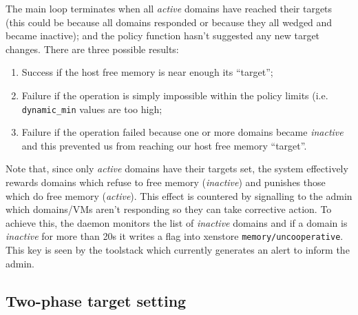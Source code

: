 \documentclass{article}
\begin{document}
The main loop terminates when all {\em active} domains have reached their targets (this could be because all domains responded or because they all wedged and became inactive); and the policy function hasn't suggested any new target changes. There are three possible results:
\begin{enumerate}
\item Success if the host free memory is near enough its ``target'';
\item Failure if the operation is simply impossible within the policy limits (i.e. \texttt{dynamic\_min} values are too high;
\item Failure if the operation failed because one or more domains became {\em inactive} and this prevented us from reaching our host free memory ``target''.
\end{enumerate}
Note that, since only {\em active} domains have their targets set, the system effectively rewards domains which refuse to free memory ({\em inactive}) and punishes those which do free memory ({\em active}). This effect is countered by signalling to the admin which domains/VMs aren't responding so they can take corrective action.
To achieve this, the daemon monitors the list of {\em inactive} domains and if a domain is {\em inactive} for more than 20s it writes a flag into xenstore \texttt{memory/uncooperative}. This key is seen by the \xapi{} toolstack which currently generates an alert to inform the admin.


\subsection{Two-phase target setting}
\label{twophase section}
\end{document}
